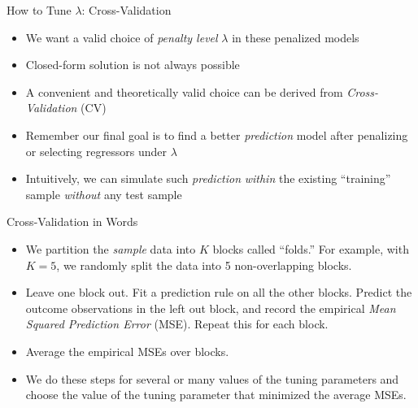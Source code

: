 \documentclass[aspectratio=1610,12pt,xcolor=dvipsnames]{beamer}
\begin{document}
\begin{frame}{How to Tune $\lambda$: Cross-Validation}

\begin{itemize}
    \item We want a valid choice of \textit{penalty level} $\lambda$ in these penalized models
    \item Closed-form solution is not always possible
    \item A convenient and theoretically valid choice can be derived from \textit{Cross-Validation} (CV) \pause
    \item Remember our final goal is to find a better \textit{prediction} model after penalizing or selecting regressors under $\lambda$
    \item Intuitively, we can simulate such \textit{prediction} \textit{within} the existing ``training'' sample \textit{without} any test sample
\end{itemize}   
\end{frame}

\begin{frame}{Cross-Validation in Words}

\begin{itemize}
    \item We partition the \textit{sample} data into $K$ blocks called ``folds.'' For example, with $K=5$, we randomly split the data into 5 non-overlapping blocks.
    \item Leave one block out. Fit a prediction rule on all the other blocks. Predict the outcome observations in the left out block, and record the empirical \textit{Mean Squared Prediction Error} (MSE). Repeat this for each block.
    \item Average the empirical MSEs over blocks.
    \item We do these steps for several or many values of the tuning parameters and choose the value of the tuning parameter that minimized the average MSEs.
\end{itemize}   
\end{frame}
\end{document}
